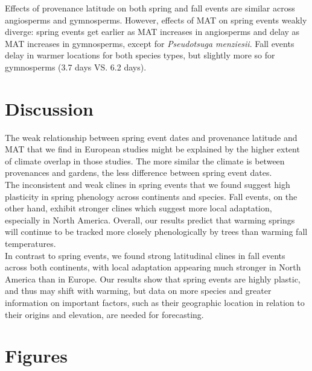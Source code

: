 \documentclass{article}
\begin{document}
Effects of provenance latitude on both spring and fall events are similar across angiosperms and gymnosperms. However, effects of MAT on spring events weakly diverge: spring events get earlier as MAT increases in angiosperms and delay as MAT increases in gymnosperms, except for \emph{Pseudotsuga menziesii}. Fall events delay in warmer locations for both species types, but slightly more so for gymnosperms (3.7 days VS. 6.2 days).


\section{Discussion}




The weak relationship between spring event dates and provenance latitude and MAT that we find in European studies might be explained by the higher extent of climate overlap in those studies. The more similar the climate is between provenances and gardens, the less difference between spring event dates.
\\

The inconsistent and weak clines in spring events that we found suggest high plasticity in spring phenology across continents and species. Fall events, on the other hand, exhibit stronger clines which suggest more local adaptation, especially in North America. Overall, our results predict that warming springs will continue to be tracked more closely phenologically by trees than warming fall temperatures.
\\

In contrast to spring events, we found strong latitudinal clines in fall events across both continents, with local adaptation appearing much stronger in North America than in Europe. Our results show that spring events are highly plastic, and thus may shift with warming, but data on more species and greater information on important factors, such as their geographic location in relation to their origins and elevation, are needed for forecasting. 




\citet{Keir11}



\section{Figures}


\end{document}
